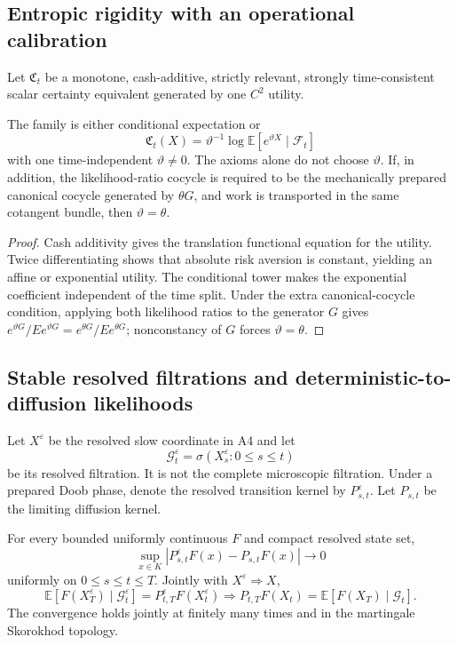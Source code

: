 \subsection{Entropic rigidity with an operational calibration}

Let \(\mathfrak C_t\) be a monotone, cash-additive, strictly relevant,
strongly time-consistent scalar certainty equivalent generated by one
\(C^2\) utility.

\begin{theorem}
\label{thm:r3-c2-rigidity}
The family is either conditional expectation or
\[
 \mathfrak C_t(X)
 =\vartheta^{-1}\log
 \mathbb E[e^{\vartheta X}\mid\mathcal F_t]
\]
with one time-independent \(\vartheta\ne0\).  The axioms alone do not choose
\(\vartheta\).  If, in addition, the likelihood-ratio cocycle is required to
be the mechanically prepared canonical cocycle generated by
\(\theta G\), and work is transported in the same cotangent bundle, then
\(\vartheta=\theta\).
\end{theorem}

\begin{proof}
Cash additivity gives the translation functional equation for the utility.
Twice differentiating shows that absolute risk aversion is constant, yielding
an affine or exponential utility.  The conditional tower makes the exponential
coefficient independent of the time split.  Under the extra canonical-cocycle
condition, applying both likelihood ratios to the generator \(G\) gives
\(e^{\vartheta G}/Ee^{\vartheta G}=e^{\theta G}/Ee^{\theta G}\); nonconstancy
of \(G\) forces \(\vartheta=\theta\).
\end{proof}

\subsection{Stable resolved filtrations and deterministic-to-diffusion likelihoods}

Let \(X^\varepsilon\) be the resolved slow coordinate in A4 and let
\[
 \mathcal G_t^\varepsilon
 =\sigma(X_s^\varepsilon:0\le s\le t)
\]
be its resolved filtration.  It is not the complete microscopic filtration.
Under a prepared Doob phase, denote the resolved transition kernel by
\(P_{s,t}^\varepsilon\).  Let \(P_{s,t}\) be the limiting diffusion kernel.

\begin{lemma}
\label{lem:r4-c2-kernel}
For every bounded uniformly continuous \(F\) and compact resolved state set,
\[
 \sup_{x\in K}
 |P_{s,t}^\varepsilon F(x)-P_{s,t}F(x)|\to0
\]
uniformly on \(0\le s\le t\le T\).  Jointly with
\(X^\varepsilon\Rightarrow X\),
\[
 \mathbb E[F(X_T^\varepsilon)\mid\mathcal G_t^\varepsilon]
 =P_{t,T}^\varepsilon F(X_t^\varepsilon)
 \Rightarrow P_{t,T}F(X_t)
 =\mathbb E[F(X_T)\mid\mathcal G_t].
\]
The convergence holds jointly at finitely many times and in the martingale
Skorokhod topology.
\end{lemma}

